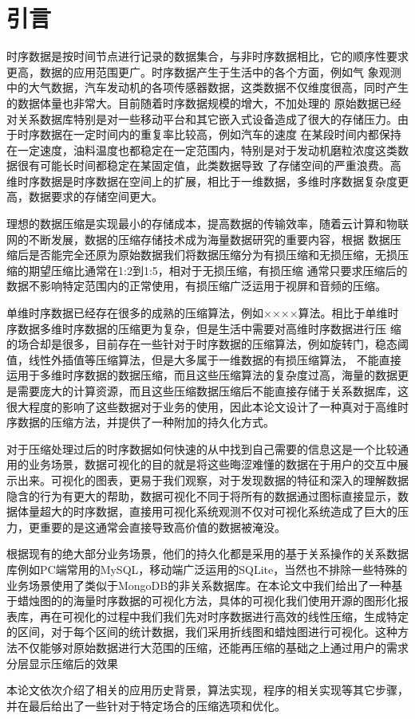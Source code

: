
\chapter{引言}
\label{Chapter 1}

时序数据是按时间节点进行记录的数据集合，与非时序数据相比，它的顺序性要求更高，数据的应用范围更广。时序数据产生于生活中的各个方面，例如气
象观测中的大气数据，汽车发动机的各项传感器数据，这类数据不仅维度很高，同时产生的数据体量也非常大。目前随着时序数据规模的增大，不加处理的
原始数据已经对关系数据库特别是对一些移动平台和其它嵌入式设备造成了很大的存储压力。由于时序数据在一定时间内的重复率比较高，例如汽车的速度
在某段时间内都保持在一定速度，油料温度也都稳定在一定范围内，特别是对于发动机磨粒浓度这类数据很有可能长时间都稳定在某固定值，此类数据导致
了存储空间的严重浪费。高维时序数据是时序数据在空间上的扩展，相比于一维数据，多维时序数据复杂度更高，数据要求的存储空间更大。

理想的数据压缩是实现最小的存储成本，提高数据的传输效率，随着云计算和物联网的不断发展，数据的压缩存储技术成为海量数据研究的重要内容，根据
数据压缩后是否能完全还原为原始数据我们将数据压缩分为有损压缩和无损压缩，无损压缩的期望压缩比通常在1:2到1:5，相对于无损压缩，有损压缩
通常只要求压缩后的数据不影响特定范围内的正常使用，有损压缩广泛运用于视屏和音频的压缩。

单维时序数据已经存在很多的成熟的压缩算法，例如××××算法。相比于单维时序数据多维时序数据的压缩更为复杂，但是生活中需要对高维时序数据进行压
缩的场合却是很多，目前存在一些针对于时序数据的压缩算法，例如旋转门，稳态阈值，线性外插值等压缩算法，但是大多属于一维数据的有损压缩算法，
不能直接运用于多维时序数据的数据压缩，而且这些压缩算法的复杂度过高，海量的数据更是需要庞大的计算资源，而且这些压缩数据压缩后不能直接存储于关系数据库，这很大程度的影响了这些数据对于业务的使用，因此本论文设计了一种真对于高维时序数据的压缩方法，并提供了一种附加的持久化方式。

对于压缩处理过后的时序数据如何快速的从中找到自己需要的信息这是一个比较通用的业务场景，数据可视化的目的就是将这些晦涩难懂的数据在于用户的交互中展示出来。可视化的图表，更易于我们观察，对于发现数据的特征和深入的理解数据隐含的行为有更大的帮助，数据可视化不同于将所有的数据通过图标直接显示，数据体量超大的时序数据，直接用可视化系统观测不仅对可视化系统造成了巨大的压力，更重要的是这通常会直接导致高价值的数据被淹没。

根据现有的绝大部分业务场景，他们的持久化都是采用的基于关系操作的关系数据库例如PC端常用的MySQL，移动端广泛运用的SQLite，当然也不排除一些特殊的业务场景使用了类似于MongoDB的非关系数据库。在本论文中我们给出了一种基于蜡烛图的的海量时序数据的可视化方法，具体的可视化我们使用开源的图形化报表库，再在可视化的过程中我们我们先对时序数据进行高效的线性压缩，生成特定的区间，对于每个区间的统计数据，我们采用折线图和蜡烛图进行可视化。这种方法不仅能够对原始数据进行大范围的压缩，还能再压缩的基础之上通过用户的需求分层显示压缩后的效果

本论文依次介绍了相关的应用历史背景，算法实现，程序的相关实现等其它步骤，并在最后给出了一些针对于特定场合的压缩选项和优化。







